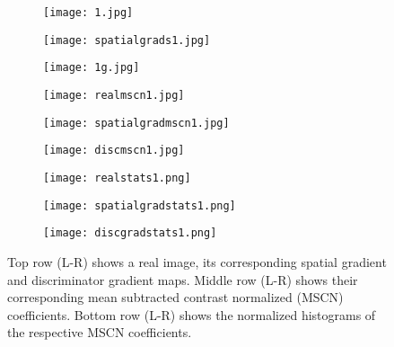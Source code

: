 \documentclass{article}
\begin{document}
\begin{figure*}[!htbp]
\begin{center}
\begin{subfigure}[b]{0.2\textwidth}
\texttt{[image: 1.jpg]}
\end{subfigure}
\begin{subfigure}[b]{0.2\textwidth}
\texttt{[image: spatialgrads1.jpg]}
\end{subfigure}
\begin{subfigure}[b]{0.2\textwidth}
\texttt{[image: 1g.jpg]}
\end{subfigure}
\end{center}
\begin{center}
\begin{subfigure}[b]{0.2\textwidth}
\texttt{[image: realmscn1.jpg]}
\end{subfigure}
\begin{subfigure}[b]{0.2\textwidth}
\texttt{[image: spatialgradmscn1.jpg]}
\end{subfigure}
\begin{subfigure}[b]{0.2\textwidth}
\texttt{[image: discmscn1.jpg]}
\end{subfigure}
\end{center}
\begin{center}
\begin{subfigure}[b]{0.2\textwidth}
\texttt{[image: realstats1.png]}


\end{subfigure}
\begin{subfigure}[b]{0.2\textwidth}
\texttt{[image: spatialgradstats1.png]}
\end{subfigure}
\begin{subfigure}[b]{0.2\textwidth}
\texttt{[image: discgradstats1.png]}
\end{subfigure}
\caption{Top row (L-R) shows a real image, its corresponding spatial gradient and discriminator gradient maps.
Middle row (L-R) shows their corresponding mean subtracted contrast normalized (MSCN) coefficients.
Bottom row (L-R) shows the normalized histograms of the respective MSCN coefficients.}
\label{fig:nss_grad1_22}
\end{center}
\end{figure*}
\end{document}
